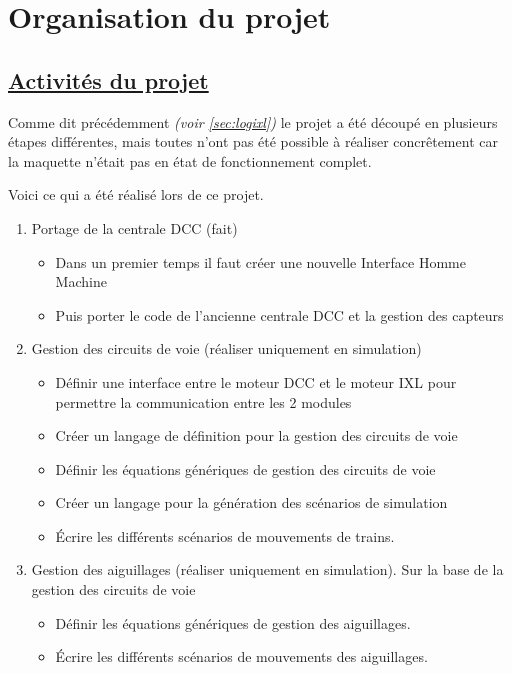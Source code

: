 \newpage
\section{Organisation du projet}
\label{sec:org_proj}

\subsection{\underline{Activit\'es du projet}}
\label{sec:activ}

Comme dit précédemment \emph{(voir \ref{sec:logixl})} le projet a \'et\'e
découp\'e en plusieurs \'etapes diff\'erentes, mais toutes n'ont pas été
possible à réaliser concrêtement car la maquette n'\'etait pas en \'etat de
fonctionnement complet.


Voici ce qui a \'et\'e r\'ealis\'e lors de ce projet.

\begin{enumerate}[1]
  \item Portage de la centrale DCC (fait)
  \begin{itemize}
    \item Dans un premier temps il faut cr\'eer une nouvelle Interface
      Homme Machine
    \item Puis porter le code de l'ancienne centrale DCC et la
      gestion des capteurs
  \end{itemize}

  \item Gestion des circuits de voie (réaliser uniquement en simulation)
  \begin{itemize}
    \item D\'efinir une interface entre le moteur DCC et le moteur IXL pour
      permettre la communication entre les 2 modules
    \item Cr\'eer un langage de d\'efinition pour la gestion des circuits
      de voie
    \item D\'efinir les \'equations g\'en\'eriques de gestion des circuits
      de voie
    \item Cr\'eer un langage pour la g\'en\'eration des sc\'enarios de
      simulation
    \item \'Ecrire les diff\'erents sc\'enarios de mouvements de trains.
  \end{itemize}

  
  \item Gestion des aiguillages (réaliser uniquement en simulation). Sur la
  base de la gestion des circuits de voie  
    \begin{itemize} 
      \item D\'efinir les \'equations g\'en\'eriques de gestion des aiguillages.
    \item \'Ecrire les diff\'erents sc\'enarios de mouvements des aiguillages.
    \end{itemize}
\end{enumerate}

